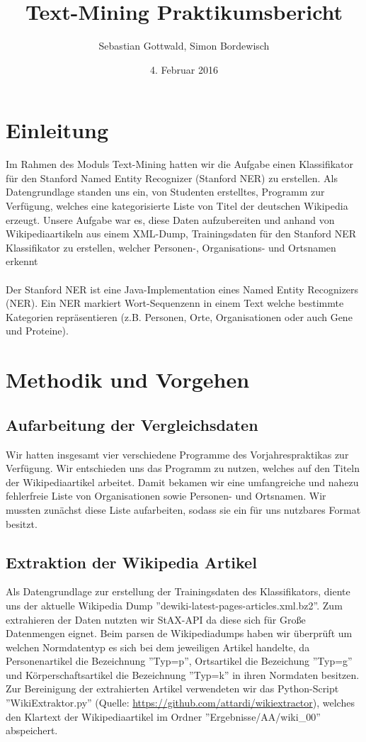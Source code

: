 \documentclass[a4paper]{article}
\author{Sebastian Gottwald, Simon Bordewisch}
\title{Text-Mining Praktikumsbericht}
\date{4. Februar 2016}
\begin{document}
\maketitle
\newpage
\section{Einleitung}
Im Rahmen des Moduls Text-Mining hatten wir die Aufgabe einen Klassifikator für den Stanford Named Entity Recognizer (Stanford NER) zu erstellen. Als Datengrundlage standen uns ein, von Studenten erstelltes, Programm zur Verfügung, welches eine kategorisierte Liste von Titel der deutschen Wikipedia erzeugt. Unsere Aufgabe war es, diese Daten aufzubereiten und anhand von Wikipediaartikeln aus einem XML-Dump, Trainingsdaten für den Stanford NER Klassifikator zu erstellen, welcher Personen-, Organisations- und Ortsnamen erkennt
\\\\
Der Stanford NER ist eine Java-Implementation eines Named Entity Recognizers (NER). Ein NER markiert Wort-Sequenzenn in einem Text welche bestimmte Kategorien repräsentieren (z.B. Personen, Orte, Organisationen oder auch Gene und Proteine).
\section{Methodik und Vorgehen}
\subsection{Aufarbeitung der Vergleichsdaten}
Wir hatten insgesamt vier verschiedene Programme des Vorjahrespraktikas zur Verfügung. Wir entschieden uns das Programm zu nutzen, welches auf den Titeln der Wikipediaartikel arbeitet. Damit bekamen wir eine umfangreiche und nahezu fehlerfreie Liste von Organisationen sowie Personen- und Ortsnamen. Wir mussten zunächst diese Liste aufarbeiten, sodass sie ein für uns nutzbares Format besitzt. 
\subsection{Extraktion der Wikipedia Artikel}
Als Datengrundlage zur erstellung der Trainingsdaten des Klassifikators, diente uns der aktuelle Wikipedia Dump ''dewiki-latest-pages-articles.xml.bz2''. Zum extrahieren der Daten nutzten wir StAX-API da diese sich für Große Datenmengen eignet. Beim parsen de Wikipediadumps haben wir überprüft um welchen Normdatentyp es sich bei dem jeweiligen Artikel handelte, da Personenartikel die Bezeichnung ''Typ=p'', Ortsartikel die Bezeichung ''Typ=g'' und Körperschaftsartikel die Bezeichnung ''Typ=k'' in ihren Normdaten besitzen. Zur Bereinigung der extrahierten Artikel verwendeten wir das Python-Script ''WikiExtraktor.py'' (Quelle: \url{https://github.com/attardi/wikiextractor}), welches den Klartext der Wikipediaartikel im Ordner ''Ergebnisse/AA/wiki\_00'' abspeichert.
\end{document}
